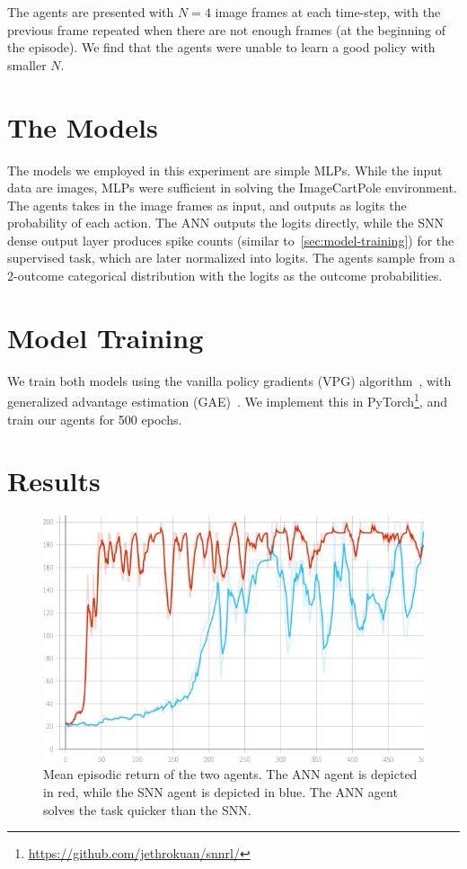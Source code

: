 \documentclass[fyp]{socreport}
\begin{document}
The agents are presented with $N = 4$ image frames at each time-step, with the
previous frame repeated when there are not enough frames (at the beginning of
the episode). We find that the agents were unable to learn a good policy with
smaller $N$.

\section{The Models}

The models we employed in this experiment are simple MLPs. While the input data
are images, MLPs were sufficient in solving the ImageCartPole environment. The
agents takes in the image frames as input, and outputs as logits the probability
of each action. The ANN outputs the logits directly, while the SNN dense output
layer produces spike counts (similar to~\autoref{sec:model-training}) for the
supervised task, which are later normalized into logits. The agents sample from
a 2-outcome categorical distribution with the logits as the outcome
probabilities.

\section{Model Training}

We train both models using the vanilla policy gradients (VPG)
algorithm~\cite{schulman2016optimizing}, with generalized advantage estimation
(GAE)~\cite{schulman2015high}. We implement this in
PyTorch\footnote{\url{https://github.com/jethrokuan/snnrl/}}, and train our
agents for 500 epochs.

\section{Results}

\begin{figure}
  \centering \includegraphics[width=0.55\columnwidth]{images/ep-ret-mean.png}
  \caption{Mean episodic return of the two agents. The ANN agent is depicted in
    red, while the SNN agent is depicted in blue. The ANN agent solves the task
    quicker than the SNN.\label{fig:ep-ret-mean}}
\end{figure}
\end{document}
